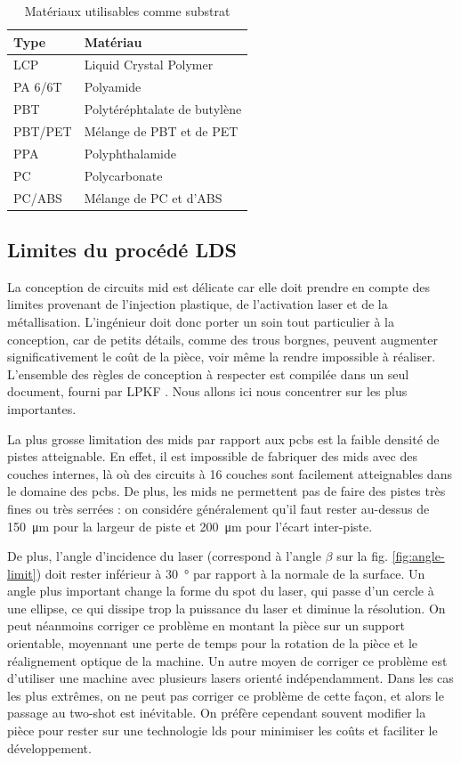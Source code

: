 \begin{table}[h]
\centering
\begin{tabular}{l l}
\toprule 
Type & Matériau \\
\midrule %
LCP & Liquid Crystal Polymer \\
PA 6/6T & Polyamide \\
PBT & Polytéréphtalate de butylène \\
PBT/PET & Mélange de PBT et de PET \\
PPA & Polyphthalamide \\
PC & Polycarbonate \\
PC/ABS & Mélange de PC et d'ABS \\ 
\bottomrule 
\end{tabular}
\caption{Matériaux utilisables comme substrat}
\label{tab:mid-materials}
\end{table}

\subsection{Limites du procédé LDS}
La conception de circuits \gls{mid} est délicate car elle doit prendre en compte des limites provenant de l'injection plastique, de l'activation laser et de la métallisation.
L'ingénieur doit donc porter un soin tout particulier à la conception, car de petits détails, comme des trous borgnes, peuvent augmenter significativement le coût de la pièce, voir même la rendre impossible à réaliser.
L'ensemble des règles de conception à respecter est compilée dans un seul document, fourni par LPKF \cite{mid-design-rules}.
Nous allons ici nous concentrer sur les plus importantes.

La plus grosse limitation des \glspl{mid} par rapport aux \glspl{pcb} est la faible densité de pistes atteignable.
En effet, il est impossible de fabriquer des \glspl{mid} avec des couches internes, là où des circuits à 16 couches sont facilement atteignables dans le domaine des \glspl{pcb}.
De plus, les \glspl{mid} ne permettent pas de faire des pistes très fines ou très serrées : on considére généralement qu'il faut rester au-dessus de \SI{150}{\micro\meter} pour la largeur de piste et \SI{200}{\micro\meter} pour l'écart inter-piste.

De plus, l'angle d'incidence du laser (correspond à l'angle $\beta$ sur la fig. \ref{fig:angle-limit}) doit rester inférieur à \SI{30}{\degree} par rapport à la normale de la surface.
Un angle plus important change la forme du spot du laser, qui passe d'un cercle à une ellipse, ce qui dissipe trop la puissance du laser et diminue la résolution.
On peut néanmoins corriger ce problème en montant la pièce sur un support orientable, moyennant une perte de temps pour la rotation de la pièce et le réalignement optique de la machine.
Un autre moyen de corriger ce problème est d'utiliser une machine avec plusieurs lasers orienté indépendamment.
Dans les cas les plus extrêmes, on ne peut pas corriger ce problème de cette façon, et alors le passage au two-shot est inévitable.
On préfère cependant souvent modifier la pièce pour rester sur une technologie \gls{lds} pour minimiser les coûts et faciliter le développement.

